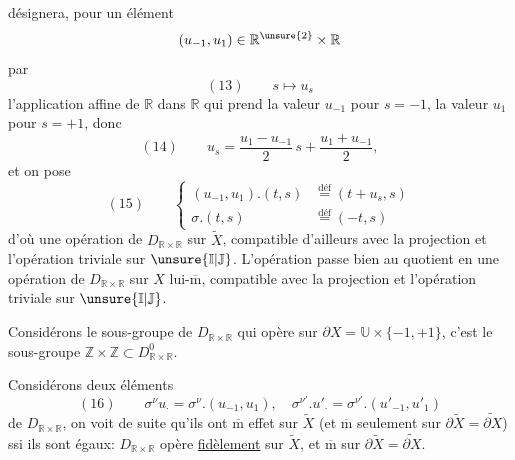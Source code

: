 désignera, pour un élément
\[
(u_{-1},u_1)\in\mathbb R^{\unsure{2}}\times\mathbb R
\]
par
\[
(13)\qquad s\longmapsto u_s
\]
l'application affine de $\mathbb R$ dans $\mathbb R$  qui prend la valeur $u_{-1}$ pour $s=-1$, la valeur $u_1$ pour $s=+1$,  donc
\[
(14)\qquad u_s=\frac{u_1-u_{-1}}2\,s+\frac{u_1+u_{-1}}2,
\]
et on pose
\[
(15)\qquad\left\{\begin{aligned}
(u_{-1},u_1).(t,s)&\overset{\text{déf}}{=}(t+u_s,s)\\
\sigma.(t,s)&\overset{\text{déf}}{=}(-t,s)
\end{aligned}\right.
\]
d'où une opération de $D_{\mathbb R\times\mathbb R}$ sur $\widetilde X$, compatible d'ailleurs avec la  projection
et l'opération triviale sur $\unsure{\mathbb I|\mathbb J}$. L'opération passe bien au quotient en une opération de $D_{\mathbb R\times\mathbb R}$ sur $X$ lui-$\overline{\mathrm m}$, compatible avec la projection
et l'opération triviale sur $\unsure{\mathbb I|\mathbb J}$.

Considérons le sous-groupe de $D_{\mathbb R\times\mathbb R}$ qui opère  sur $\partial X=\mathbb U\times\{-1,+1\}$, c'est le sous-groupe $\mathbb Z\times\mathbb Z\subset D_{\mathbb R\times\mathbb R}^{0}$.


Considérons deux éléments
\[
(16)\qquad \sigma^\nu u_\cdot=\sigma^\nu.(u_{-1},u_1),\quad\sigma^{\nu'}.u'_\cdot=\sigma^{\nu'}.(u'_{-1},u'_1)
\]
de $D_{\mathbb R\times\mathbb R}$, on voit de suite qu'ils ont $\overline{\mathrm m}$ effet sur $\widetilde X$  (et $\overline{\mathrm m}$ seulement sur $\partial\widetilde X=\widetilde{\partial X}$) ssi ils sont égaux: $D_{\mathbb R\times\mathbb R}$ opère \uline{fidèlement} sur $\widetilde X$, et $\overline{\mathrm m}$ sur $\partial\widetilde X=\widetilde{\partial X}$.

